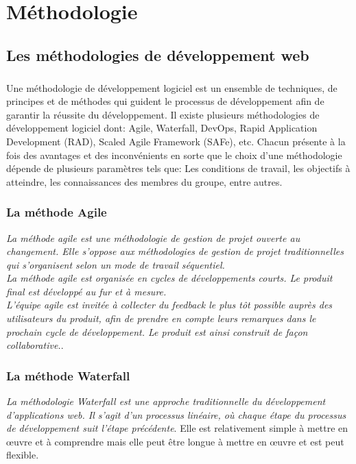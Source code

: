 \chapter{M\'ethodologie}
\label{ChapMethodologie}

	\section{Les m\'ethodologies de d\'eveloppement web \cite{MethodologieDeDeB,MethodologieDeDeA,MethodologieDeDeC}}

		\paragraph{}Une m\'ethodologie de d\'eveloppement logiciel est un ensemble de techniques, de principes et de m\'ethodes qui guident le processus de d\'eveloppement afin de garantir la r\'eussite du d\'eveloppement. Il existe plusieurs m\'ethodologies de d\'eveloppement logiciel dont:  Agile, Waterfall, DevOps, Rapid Application Development (RAD), Scaled Agile Framework (SAFe), etc. Chacun pr\'esente \`a la fois des avantages et des inconv\'enients en sorte que le choix d'une m\'ethodologie d\'epende de plusieurs param\`etres tels que: Les conditions de travail, les objectifs \`a atteindre, les connaissances des membres du groupe, entre autres.

			\subsection{La m\'ethode Agile}
				\textit{La m\'ethode agile est une m\'ethodologie de gestion de projet ouverte au changement. Elle s'oppose aux m\'ethodologies de gestion de projet traditionnelles qui s'organisent selon un mode de travail s\'equentiel.\\
				La m\'ethode agile est organis\'ee en cycles de d\'eveloppements courts. Le produit final est d\'evelopp\'e au fur et \`a mesure.\\
				L'\'equipe agile est invit\'ee \`a collecter du feedback le plus t\^ot possible aupr\`es des utilisateurs du produit, afin de prendre en compte leurs remarques dans le prochain cycle de d\'eveloppement. Le produit est ainsi construit de fa\c{c}on collaborative.}\cite{MethodeAgile}.

			\subsection{La m\'ethode Waterfall}
				\textit{La m\'ethodologie Waterfall est une approche traditionnelle du d\'eveloppement d'applications web. Il s'agit d'un processus lin\'eaire, o\`u chaque \'etape du processus de d\'eveloppement suit l'\'etape pr\'ec\'edente}\cite{MethodologieDeDeB}. Elle est relativement simple \`a mettre en œuvre et \`a comprendre mais elle peut \^etre longue \`a mettre en \oe{}uvre et est peut flexible.

